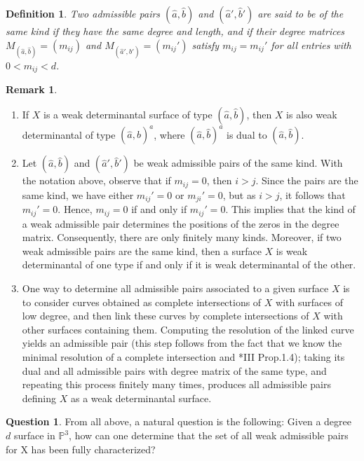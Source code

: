 \documentclass[12pt,reqno]{amsart}
\theoremstyle{plain}
\newtheorem{defi}[theorem]{Definition}
\theoremstyle{definition}
\newtheorem{ques}[theorem]{Question}
\newtheorem{rmk}[theorem]{Remark}
\theoremstyle{remark}
\theoremstyle{definition}
\newcommand{\PP}{\mathds{P}}
\newcommand{\PPP}{\PP^{3}}
\begin{document}
\begin{defi}\label{tipoadpar}
Two admissible pairs $(\hat{a},\hat{b})$ and $(\hat{a}',\hat{b}')$ are said to be of the same \textit{kind} if they have the same degree and length, and if their degree matrices $M_{(\hat{a},\hat{b})}=(m_{ij})$ and $M_{(\hat{a}',\hat{b}')}=(m_{ij}')$ satisfy $m_{ij}=m_{ij}'$ for all entries with $0<m_{ij}<d$.
\end{defi}

\begin{rmk}\label{remadmpar}
\begin{enumerate}
\item If $X$ is a weak determinantal surface of type $(\hat{a},\hat{b})$, then $X$ is also weak determinantal of type $(\hat{a},\hat{b})^{a}$, where $(\hat{a},\hat{b})^{a}$ is dual to $(\hat{a},\hat{b})$.

\item Let $(\hat{a},\hat{b})$ and $(\hat{a}',\hat{b}')$ be weak admissible pairs of the same kind. With the notation above, observe that if $m_{ij}=0$, then $i>j$. Since the pairs are the same kind, we have either $m_{ij}'=0$ or $m_{ji}'=0$, but as $i>j$, it follows that $m_{ij}'=0$. Hence, $m_{ij}=0$ if and only if $m_{ij}'=0$. This implies that the kind of a weak admissible pair determines the positions of the zeros in the degree matrix. Consequently, there are only finitely many kinds. Moreover, if two weak admissible pairs are the same kind, then a surface $X$ is weak determinantal of one type if and only if it is weak determinantal of the other.

\item One way to determine all admissible pairs associated to a given surface $X$ is to consider curves obtained as complete intersections of $X$ with surfaces of low degree, and then link these curves by complete intersections of $X$ with other surfaces containing them. Computing the resolution of the linked curve yields an admissible pair (this step follows from the fact that we know the minimal resolution of a complete intersection and \cite{mdp2}*{III Prop.1.4}); taking its dual and all admissible pairs with degree matrix of the same type, and repeating this process finitely many times, produces all admissible pairs defining $X$ as a weak determinantal surface.
\end{enumerate}
\end{rmk}


\begin{ques}
    From all above, a natural question is the following: Given a degree $d$ surface in $\PPP$, how can one determine that the set of all weak admissible pairs for X has been fully characterized?
\end{ques}
\end{document}
